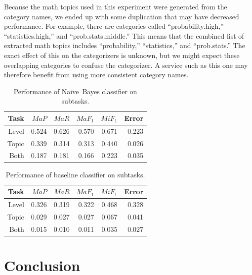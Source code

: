 \documentclass{ios}
\newcommand{\naive}{Na\"\i ve}
\begin{document}
Because the math topics used in this experiment were generated from
the category names, we ended up with some duplication that may have
decreased performance.  For example, there are categories called
``probability.high,'' ``statistics.high,'' and ``prob.stats.middle.''
This means that the combined list of extracted math topics includes
``probability,'' ``statistics,'' and ``prob.stats.''  The exact effect
of this on the categorizers is unknown, but we might expect these
overlapping categories to confuse the categorizer.  A service such as
this one may therefore benefit from using more consistent category
names.


\begin{table}
\begin{center}
\begin{tabular}{|r|r|r|r|r|r|}
\hline
Task     & $MaP$   & $MaR$   & $MaF_1$ & $MiF_1$ & Error \\ \hline
Level    & 0.524   & 0.626   & 0.570   & 0.671   & 0.223 \\ \hline
Topic    & 0.339   & 0.314   & 0.313   & 0.440   & 0.026 \\ \hline
Both     & 0.187   & 0.181   & 0.166   & 0.223   & 0.035 \\ \hline
\end{tabular}
\end{center}
\caption{Performance of \naive\ Bayes classifier on subtasks.}
\label{results-NB}
\end{table}

\begin{table}
\begin{center}
\begin{tabular}{|r|r|r|r|r|r|}
\hline
Task     & $MaP$   & $MaR$   & $MaF_1$ & $MiF_1$ & Error \\ \hline
Level    & 0.326   & 0.319   & 0.322   & 0.468   & 0.328 \\ \hline
Topic    & 0.029   & 0.027   & 0.027   & 0.067   & 0.041 \\ \hline
Both     & 0.015   & 0.010   & 0.011   & 0.035   & 0.027 \\ \hline
\end{tabular}
\end{center}
\caption{Performance of baseline classifier on subtasks.}
\label{results-baseline}
\end{table}


 
\section{Conclusion}
\end{document}
